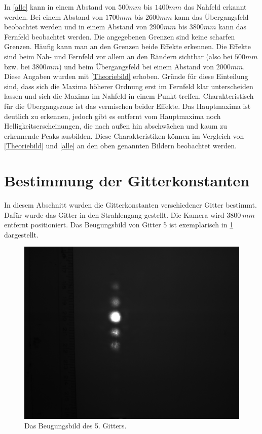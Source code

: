 In \cref{alle} kann in einem Abstand von $500 mm$ bis $1400 mm$ das Nahfeld erkannt werden. Bei einem Abstand von $1700 mm$ bis $2600 mm$  kann das Übergangsfeld beobachtet werden und in einem Abstand von $2900 mm$ bis $3800 mm$ kann das Fernfeld beobachtet werden. Die angegebenen Grenzen sind keine scharfen Grenzen. Häufig kann man an den Grenzen beide Effekte erkennen. Die Effekte sind beim Nah- und Fernfeld vor allem an den Rändern sichtbar (also bei $500 mm$ bzw. bei $3800 mm$) und beim Übergangsfeld bei einem Abstand von $2000 mm$. Diese Angaben wurden mit \cref{Theoriebild} erhoben. Gründe für diese Einteilung sind, dass sich die Maxima höherer Ordnung erst im Fernfeld klar unterscheiden lassen und sich die Maxima im Nahfeld in einem Punkt treffen. Charakteristisch für die Übergangszone ist das vermischen beider Effekte. Das Hauptmaxima ist deutlich zu erkennen, jedoch gibt es entfernt vom Hauptmaxima noch Helligkeitserscheinungen, die nach außen hin abschwächen und kaum zu erkennende Peaks ausbilden. Diese Charakteristiken können im Vergleich von \cref{Theoriebild} und \cref{alle} an den oben genannten Bildern beobachtet werden.

\section{Bestimmung der Gitterkonstanten}
In diesem Abschnitt wurden die Gitterkonstanten verschiedener Gitter bestimmt. Dafür wurde das Gitter in den Strahlengang gestellt. Die Kamera wird $\SI{3800}{mm}$ entfernt positioniert. Das Beugungsbild von Gitter 5 ist exemplarisch in \cref{Gitter5} dargestellt.

\begin{figure}
	\centering
	\includegraphics[scale=0.4]{Gitter5.jpg}
	\caption{Das Beugungsbild des 5. Gitters.}
	\label{Gitter5}
\end{figure}

